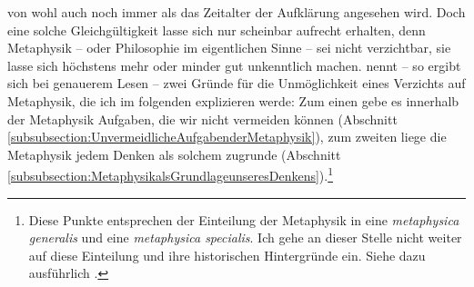 von  wohl auch noch immer als das Zeitalter der Aufklärung
angesehen wird. Doch eine solche Gleichgültigkeit lasse sich nur scheinbar
aufrecht erhalten, denn Metaphysik -- oder Philosophie im eigentlichen Sinne --
sei nicht verzichtbar, sie lasse sich höchstens mehr oder minder gut unkenntlich
machen.  nennt -- so ergibt sich bei genauerem Lesen --
zwei Gründe für die Unmöglichkeit eines Verzichts auf Metaphysik, die ich im
folgenden explizieren werde:
Zum einen gebe es innerhalb der Metaphysik Aufgaben, die wir nicht vermeiden können
(Abschnitt
\ref{subsubsection:UnvermeidlicheAufgabenderMetaphysik}), zum
zweiten liege die Metaphysik jedem Denken als solchem zugrunde
(Abschnitt \ref{subsubsection:MetaphysikalsGrundlageunseresDenkens}).\footnote{Diese Punkte
entsprechen der Einteilung der Metaphysik in eine \emph{metaphysica generalis}
und eine \emph{metaphysica specialis}. Ich gehe an dieser Stelle nicht weiter
auf diese Einteilung  und ihre historischen Hintergründe ein. Siehe dazu ausführlich
\cite{Vollrath:DieGliederungderMetaphysikineineMetaphysicaGeneralisundeineMetaphysicaSpecialis1962}.}

